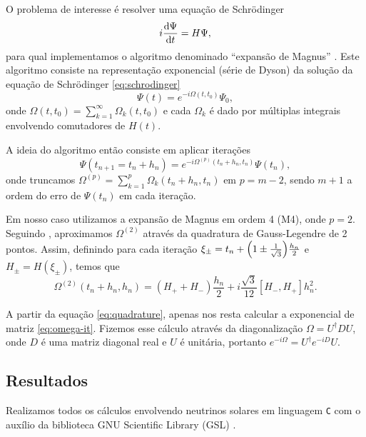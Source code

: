 \documentclass[12pt]{report}
\begin{document}
O problema de interesse é resolver uma equação de Schrödinger
\begin{equation} \label{eq:schrodinger}
i \dv{\Psi}{t} = H \Psi,
\end{equation}
para qual implementamos o algoritmo denominado ``expansão de Magnus'' \cite{efficient-nu}. Este algoritmo consiste na representação exponencial (série de Dyson) da solução da equação de Schrödinger \ref{eq:schrodinger}
\begin{equation} \label{eq:omega}
\Psi(t) = e^{-i \Omega(t, t_0)} \Psi_0,
\end{equation}
onde $\Omega(t, t_0) =  \sum_{k=1}^{\infty} \Omega_k(t, t_0)$ e cada $\Omega_k$ é dado por múltiplas integrais envolvendo comutadores de $H(t)$.

A ideia do algoritmo então consiste em aplicar iterações
\begin{equation} \label{eq:omega-it}
\Psi(t_{n+1} = t_{n} + h_n) = e^{-i \Omega^{(p)}(t_n + h_n, t_n)} \Psi(t_n),
\end{equation}
onde truncamos $\Omega^{(p)} = \sum_{k=1}^{p} \Omega_k(t_n + h_n, t_n)$ em $p = m-2$, sendo $m + 1$ a ordem do erro de $\Psi(t_n)$ em cada iteração.

Em nosso caso utilizamos a expansão de Magnus em ordem 4 (M4), onde $p = 2$. Seguindo \cite{efficient-nu}, aproximamos $\Omega^{(2)}$ através da quadratura de Gauss-Legendre de 2 pontos. Assim, definindo para cada iteração $\xi_{\pm} = t_n + \qty(1 \pm \frac{1}{\sqrt{3}}) \frac{h_n}{2}$ e $H_{\pm} = H(\xi_{\pm})$, temos que
\begin{equation} \label{eq:quadrature}
\Omega^{(2)}(t_n + h_n, h_n) = (H_+ + H_-) \frac{h_n}{2} +
i \frac{\sqrt{3}}{12} [H_-, H_+] h_n^2.
\end{equation}

A partir da equação \ref{eq:quadrature}, apenas nos resta calcular a exponencial de matriz \ref{eq:omega-it}. Fizemos esse cálculo através da diagonalização $\Omega = U^\dagger D U$, onde $D$ é uma matriz diagonal real e $U$ é unitária, portanto $e^{-i \Omega} = U^\dagger e^{-i D} U$.

\subsection{Resultados} \label{sec:solar-results}

Realizamos todos os cálculos envolvendo neutrinos solares em linguagem \texttt{C} com o auxílio da biblioteca GNU Scientific Library (GSL) \cite{gsl}.
\end{document}
